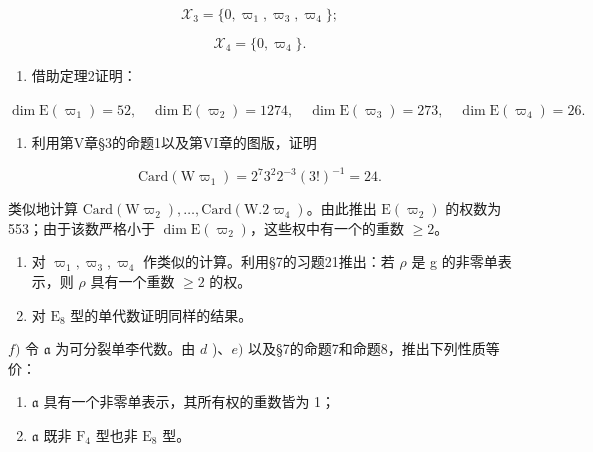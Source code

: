 \[
\mathcal {X} _ {3} = \{0, \varpi_ {1}, \varpi_ {3}, \varpi_ {4} \};
\]

\[
\mathcal {X} _ {4} = \{0, \varpi_ {4} \}.
\]

\begin{enumerate}
\def\labelenumi{\alph{enumi})}
\setcounter{enumi}{1}
\tightlist
\item
  借助定理2证明：
\end{enumerate}

\(\dim \mathrm{E}(\varpi_1) = 52,\quad \dim \mathrm{E}(\varpi_2) = 1274,\quad \dim \mathrm{E}(\varpi_3) = 273,\quad \dim \mathrm{E}(\varpi_4) = 26.\)

\begin{enumerate}
\def\labelenumi{\alph{enumi})}
\setcounter{enumi}{2}
\tightlist
\item
  利用第V章§3的命题1以及第VI章的图版，证明
\end{enumerate}

\[
\mathrm{Card} (\mathrm{W} \varpi_ {1}) = 2 ^ {7} 3 ^ {2} 2 ^ {- 3} (3!) ^ {- 1} = 24.
\]

类似地计算 \(\mathrm{Card}(\mathrm{W}\varpi_{2}),\ldots,\mathrm{Card}(\mathrm{W}.2\varpi_{4})\)。由此推出 \(\mathrm{E}(\varpi_{2})\) 的权数为 553；由于该数严格小于 \(\dim\mathrm{E}(\varpi_{2})\)，这些权中有一个的重数 \(\geq2\)。

\begin{enumerate}
\def\labelenumi{\alph{enumi})}
\setcounter{enumi}{3}
\item
  对 \(\varpi_{1},\varpi_{3},\varpi_{4}\) 作类似的计算。利用§7的习题21推出：若 \(\rho\) 是 g 的非零单表示，则 \(\rho\) 具有一个重数 \(\geq2\) 的权。
\item
  对 \(\mathrm{E}_8\) 型的单代数证明同样的结果。
\end{enumerate}

\(f)\) 令 \(\mathfrak{a}\) 为可分裂单李代数。由 \(d\) )、\(e)\) 以及§7的命题7和命题8，推出下列性质等价：

\begin{enumerate}
\def\labelenumi{(\roman{enumi})}
\item
  \(\mathfrak{a}\) 具有一个非零单表示，其所有权的重数皆为 1；
\item
  \(\mathfrak{a}\) 既非 \(\mathrm{F}_4\) 型也非 \(\mathrm{E}_8\) 型。
\end{enumerate}


